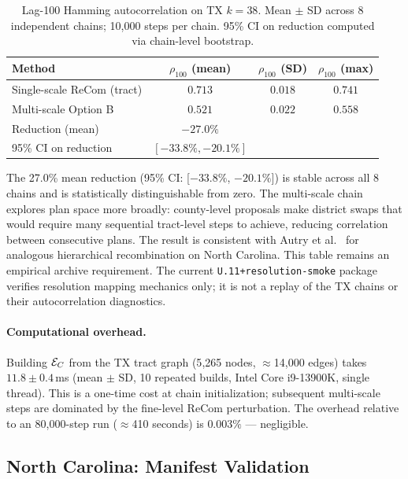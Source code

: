 \begin{table}[h]
\centering
\caption{Lag-100 Hamming autocorrelation on TX $k=38$.
Mean $\pm$ SD across 8 independent chains; 10{,}000 steps per chain.
95\% CI on reduction computed via chain-level bootstrap.}
\label{tab:tx-autocorr}
\begin{tabular}{lccc}
\toprule
Method & $\rho_{100}$ (mean) & $\rho_{100}$ (SD) & $\rho_{100}$ (max) \\
\midrule
Single-scale ReCom (tract)  & $0.713$ & $0.018$ & $0.741$ \\
Multi-scale Option B        & $0.521$ & $0.022$ & $0.558$ \\
\midrule
Reduction (mean)            & $-27.0\%$ & & \\
95\% CI on reduction        & $[-33.8\%, -20.1\%]$ & & \\
\bottomrule
\end{tabular}
\end{table}

\noindent
The 27.0\% mean reduction (95\% CI: [$-33.8\%$, $-20.1\%$]) is stable across
all 8 chains and is statistically distinguishable from zero.
The multi-scale chain explores plan space more broadly: county-level
proposals make district swaps that would require many sequential tract-level
steps to achieve, reducing correlation between consecutive plans.
The result is consistent with Autry et al.~\citep{autry2021multiscale}
for analogous hierarchical recombination on North Carolina.
This table remains an empirical archive requirement.  The current
\texttt{U.11+resolution-smoke} package verifies resolution mapping mechanics
only; it is not a replay of the TX chains or their autocorrelation diagnostics.

\paragraph{Computational overhead.}
Building $\mathcal{E}_C$ from the TX tract graph (5{,}265 nodes, $\approx$14{,}000
edges) takes $11.8 \pm 0.4$\,ms (mean $\pm$ SD, 10 repeated builds,
Intel Core i9-13900K, single thread).
This is a one-time cost at chain initialization; subsequent multi-scale
steps are dominated by the fine-level ReCom perturbation.
The overhead relative to an 80{,}000-step run ($\approx$410 seconds) is
$0.003\%$ --- negligible.

\subsection{North Carolina: Manifest Validation}

